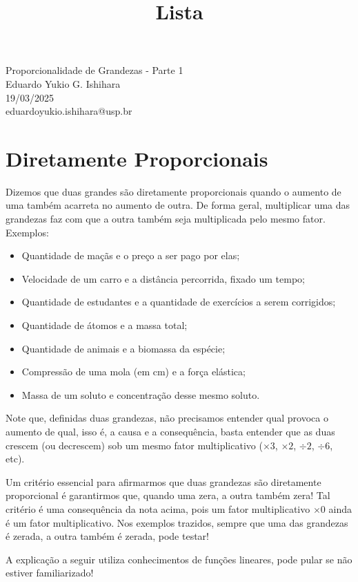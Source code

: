 \documentclass[12pt]{report}
\title{Lista}
\newcommand{\1}{\faThermometerEmpty}
\newcommand{\2}{\faThermometerQuarter}
\newcommand{\3}{\faThermometerHalf}
\newcommand{\4}{\faThermometerThreeQuarters}
\newcommand{\5}{\faThermometerFull}
\begin{document}
\begin{center}
{\Large Proporcionalidade de Grandezas - Parte 1} \\
\vspace{1mm}
Eduardo Yukio G. Ishihara \\ 19/03/2025 \\
{\footnotesize eduardoyukio.ishihara@usp.br}
\end{center}
\vspace{5mm}

\section*{Diretamente Proporcionais}
Dizemos que duas grandes são diretamente proporcionais quando o aumento de uma também acarreta no aumento de outra. De forma geral, multiplicar uma das grandezas faz com que a outra também seja multiplicada pelo mesmo fator.
Exemplos:
\begin{itemize}
    \item Quantidade de maçãs e o preço a ser pago por elas;
    \item Velocidade de um carro e a distância percorrida, fixado um tempo;
    \item Quantidade de estudantes e a quantidade de exercícios a serem corrigidos;
    \item Quantidade de átomos e a massa total;
    \item Quantidade de animais e a biomassa da espécie;
    \item Compressão de uma mola (em cm) e a força elástica;
    \item Massa de um soluto e concentração desse mesmo soluto.
\end{itemize}
Note que, definidas duas grandezas, não precisamos entender qual provoca o aumento de qual, isso é, a causa e a consequência, basta entender que as duas crescem (ou decrescem) sob um mesmo fator multiplicativo ($\times 3$, $\times 2$, $\div 2$, $\div 6$, etc).

Um critério essencial para afirmarmos que duas grandezas são diretamente proporcional é garantirmos que, quando uma zera, a outra também zera! Tal critério é uma consequência da nota acima, pois um fator multiplicativo $\times 0$ ainda é um fator multiplicativo. Nos exemplos trazidos, sempre que uma das grandezas é zerada, a outra também é zerada, pode testar!

{\footnotesize A explicação a seguir utiliza conhecimentos de funções lineares, pode pular se não estiver familiarizado!}
\end{document}
